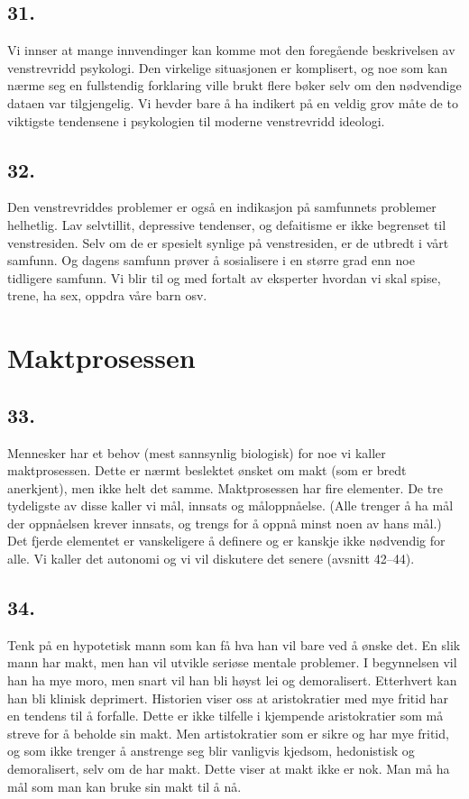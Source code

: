 \documentclass[oneside]{book}
\begin{document}
\section*{31.}
Vi innser at mange innvendinger kan komme mot den foregående beskrivelsen av
venstrevridd psykologi. Den virkelige situasjonen er komplisert, og noe som kan
nærme seg en fullstendig forklaring ville brukt flere bøker selv om den
nødvendige dataen var tilgjengelig. Vi hevder bare å ha indikert på en veldig
grov måte de to viktigste tendensene i psykologien til moderne venstrevridd
ideologi.

\section*{32.}
Den venstrevriddes problemer er også en indikasjon på samfunnets problemer
helhetlig. Lav selvtillit, depressive tendenser, og defaitisme er ikke
begrenset til venstresiden. Selv om de er spesielt synlige på venstresiden, er
de utbredt i vårt samfunn. Og dagens samfunn prøver å sosialisere i en større
grad enn noe tidligere samfunn. Vi blir til og med fortalt av eksperter hvordan
vi skal spise, trene, ha sex, oppdra våre barn osv.

\chapter{Maktprosessen}
\section*{33.}
Mennesker har et behov (mest sannsynlig biologisk) for noe vi kaller
maktprosessen. Dette er nærmt beslektet ønsket om makt (som er bredt
anerkjent), men ikke helt det samme. Maktprosessen har fire elementer. De tre
tydeligste av disse kaller vi mål, innsats og måloppnåelse. (Alle trenger å ha
mål der oppnåelsen krever innsats, og trengs for å oppnå minst noen av hans
mål.) Det fjerde elementet er vanskeligere å definere og er kanskje ikke
nødvendig for alle. Vi kaller det autonomi og vi vil diskutere det senere
(avsnitt 42--44).

\section*{34.}
Tenk på en hypotetisk mann som kan få hva han vil bare ved å ønske det. En slik
mann har makt, men han vil utvikle seriøse mentale problemer. I begynnelsen vil
han ha mye moro, men snart vil han bli høyst lei og demoralisert. Etterhvert
kan han bli klinisk deprimert. Historien viser oss at aristokratier med mye
fritid har en tendens til å forfalle. Dette er ikke tilfelle i kjempende
aristokratier som må streve for å beholde sin makt. Men artistokratier som er
sikre og har mye fritid, og som ikke trenger å anstrenge seg blir vanligvis
kjedsom, hedonistisk og demoralisert, selv om de har makt. Dette viser at makt
ikke er nok. Man må ha mål som man kan bruke sin makt til å nå.
\end{document}
